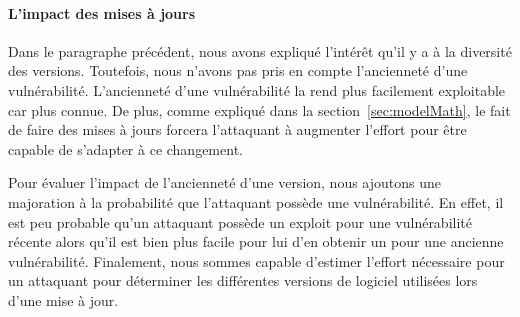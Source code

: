\paragraph{L'impact des mises à jours}
Dans le paragraphe précédent, nous avons expliqué l'intérêt qu'il y a à la diversité des versions.
Toutefois, nous n'avons pas pris en compte l'ancienneté d'une vulnérabilité. 
L'ancienneté d'une vulnérabilité la rend plus facilement exploitable car plus connue.
De plus, comme expliqué dans la section~\ref{sec:modelMath}, le fait de faire des mises à jours forcera l'attaquant à augmenter l'effort pour être capable de s'adapter à ce changement.

Pour évaluer l'impact de l'ancienneté d'une version, nous ajoutons une majoration à la probabilité que l'attaquant possède une vulnérabilité.
En effet, il est peu probable qu'un attaquant possède un exploit pour une vulnérabilité récente alors qu'il est bien plus facile pour lui d'en obtenir un pour une ancienne vulnérabilité.
Finalement, nous sommes capable d'estimer l'effort nécessaire pour un attaquant pour déterminer les différentes versions de logiciel utilisées lors d'une mise à jour.

